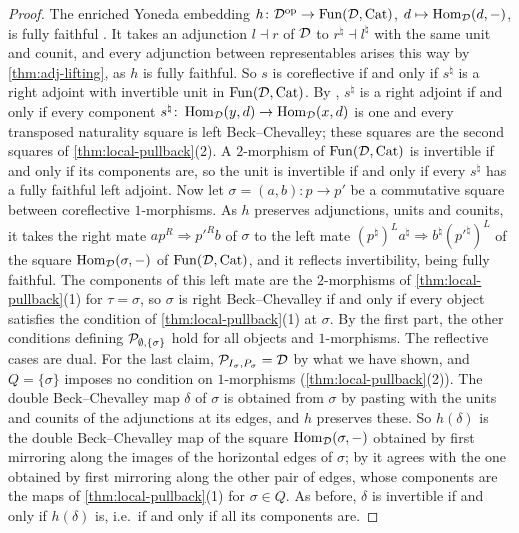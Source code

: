 \begin{proof}
%
The enriched Yoneda embedding
$h\colon \mathcal{D}^{\mathrm{op}} \to \operatorname{Fun}(\mathcal{D},\mathrm{Cat})$,
$d \mapsto \operatorname{Hom}_{\mathcal{D}}(d,-)$,
is fully faithful \cite{hinich2020yoneda,heine2023enriched}.
It takes an adjunction $l \dashv r$ of $\mathcal{D}$ to
$r^{\natural} \dashv l^{\natural}$
with the same unit and counit, and every adjunction between representables
arises this way by \cref{thm:adj-lifting}, as $h$ is fully faithful.
So $s$ is coreflective if and only if $s^{\natural}$ is a right adjoint with
invertible unit in $\operatorname{Fun}(\mathcal{D},\mathrm{Cat})$.
By \cite[Cor.~5.2.12]{abellangagnahaugseng2024straightening},
$s^{\natural}$ is a right adjoint if and only if every component
$s^{\natural}\colon \operatorname{Hom}_{\mathcal{D}}(y,d) \to \operatorname{Hom}_{\mathcal{D}}(x,d)$
is one and every transposed naturality square is left Beck--Chevalley;
these squares are the second squares of \cref{thm:local-pullback}(2).
A $2$-morphism of $\operatorname{Fun}(\mathcal{D},\mathrm{Cat})$ is invertible if and only if its components
are, so the unit is invertible if and only if every $s^{\natural}$ has a fully
faithful left adjoint.
Now let
$\sigma = (a,b)\colon p \to p'$
be a commutative square between coreflective $1$-morphisms.
As $h$ preserves adjunctions, units and counits, it takes the right mate
$ap^{R} \Rightarrow p'^{R}b$
of $\sigma$ to the left mate
$(p^{\natural})^{L}a^{\natural} \Rightarrow b^{\natural}(p'^{\natural})^{L}$
of the square $\operatorname{Hom}_{\mathcal{D}}(\sigma,-)$ of $\operatorname{Fun}(\mathcal{D},\mathrm{Cat})$,
and it reflects invertibility, being fully faithful.
The components of this left mate are the $2$-morphisms of
\cref{thm:local-pullback}(1) for $\tau = \sigma$,
so $\sigma$ is right Beck--Chevalley if and only if every object satisfies the
condition of \cref{thm:local-pullback}(1) at $\sigma$. By the first part,
the other conditions defining
$\mathcal{P}_{\emptyset,\{\sigma\}}$
hold for all objects and $1$-morphisms. The reflective cases are dual.
For the last claim,
$\mathcal{P}_{I_{\sigma},P_{\sigma}} = \mathcal{D}$
by what we have shown,
and $Q = \{\sigma\}$ imposes no condition on $1$-morphisms
(\cref{thm:local-pullback}(2)). The double Beck--Chevalley map $\delta$ of
$\sigma$ is obtained from $\sigma$ by pasting with the units and counits of the
adjunctions at its edges, and $h$ preserves these.
So $h(\delta)$ is the double Beck--Chevalley map of the square
$\operatorname{Hom}_{\mathcal{D}}(\sigma,-)$
obtained by first mirroring along the images of the horizontal edges of
$\sigma$; by \cite[Rmk.~2.2]{cnossenlenzlinskens2025universal} it agrees with
the one obtained by first mirroring along the other pair of edges,
whose components are the maps of \cref{thm:local-pullback}(1) for $\sigma \in
Q$. As before, $\delta$ is invertible if and only if $h(\delta)$ is,
i.e.\ if and only if all its components are.
\end{proof}

